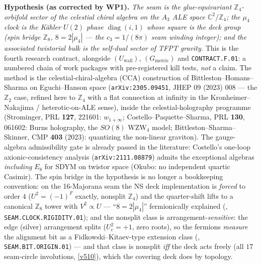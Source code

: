 \documentclass[11pt,a4paper]{article}
\newcommand{\cthree}{c_3}
\newcommand{\Z}{\mathbb Z}
\begin{document}
\par\smallskip\noindent\textbf{Hypothesis (as corrected by WP1).} \emph{The seam is the glue-equivariant
$\Z_4$-orbifold sector of the celestial chiral algebra on the $A_3$ ALE space $\mathbb C^2/\Z_4$; the
$\mu_4$ clock is the K\"ahler $U(2)$ phase $\operatorname{diag}(i,1)$ whose square is the deck group
(spin bridge $\Z_8$, $8=2|\mu_4|$ --- the $\cthree=1/(8\pi)$ seam winding integer); and the associated
twistorial bulk is the \emph{self-dual} sector of TFPT gravity.} This is the fourth research contract,
alongside $(U_{\mathrm{wall}})$, $(G_{\mathrm{metric}})$ and \texttt{CONTRACT.F.01}: a numbered chain
of work packages with pre-registered kill tests, \emph{not} a claim. The method is the celestial-chiral-algebra
(CCA) construction of Bittleston--Homans--Sharma on Eguchi--Hanson space
(\texttt{arXiv:2305.09451}, JHEP 09 (2023) 008 --- the $\Z_2$ case, refined here to $\Z_4$ with a flat
connection at infinity in the Kronheimer--Nakajima / heterotic-on-ALE sense), inside the celestial-holography
programme (Strominger, PRL \textbf{127}, 221601: $w_{1+\infty}$; Costello--Paquette--Sharma, PRL
\textbf{130}, 061602: Burns holography, the $SO(8)$ WZW$_4$ model; Bittleston--Sharma--Skinner, CMP
\textbf{403} (2023): quantizing the non-linear graviton). The gauge-algebra admissibility gate is already
passed in the literature: Costello's one-loop axionic-consistency analysis (\texttt{arXiv:2111.08879})
admits the exceptional algebras \emph{including} $E_8$ for SDYM on twistor space (Okubo: no independent
quartic Casimir). The spin bridge in the hypothesis is no longer a bookkeeping convention: on the
16-Majorana seam the NS deck implementation is \emph{forced} to order $4$ ($U^2=(-1)^F$ exactly,
nonsplit $\Z_4$) and the quarter-shift lifts to a canonical $\Z_8$ tower with $V^2\propto U$ ---
``$8=2|\mu_4|$'' fermionically explained (,
\texttt{SEAM.CLOCK.RIGIDITY.01}); and the nonsplit class is arrangement-\emph{sensitive}: the edge
(silver) arrangement splits ($U_e^2=+1$, zero roots), so the fermions \emph{measure} the alignment
bit as a Fidkowski--Kitaev-type extension class
(, \texttt{SEAM.BIT.ORIGIN.01}) --- and that class is nonsplit
\emph{iff} the deck acts freely (all $17$ seam-circle involutions, \vref{v510}), which the covering
deck does by topology.
\end{document}
